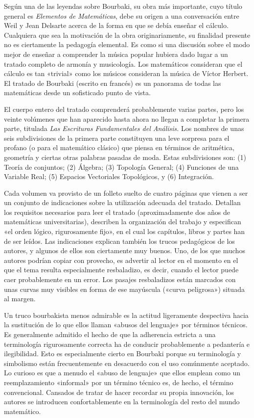 \documentclass[a4paper, 12pt]{article}
\begin{document}
Según una de las leyendas sobre Bourbaki, su obra más 
importante, cuyo título general es {\it Elementos de Matemáticas}, debe 
su origen a una conversación entre Weil y Jean Delsarte acerca de la 
forma en que se debía enseñar el cálculo. Cualquiera que sea la 
motivación de la obra originariamente, su finalidad presente no es 
ciertamente la pedagogía elemental. Es como si una discusión sobre 
el modo mejor de enseñar a comprender la música popular hubiera dado 
lugar a un tratado completo de armonía y musicología. Los 
matemáticos consideran que el cálculo es tan «trivial» como los 
músicos consideran la música de Víctor Herbert. El tratado de 
Bourbaki (escrito en francés) es un panorama de todas las 
matemáticas desde un sofisticado punto de vista. 

El cuerpo entero del tratado comprenderá probablemente varias 
partes, pero los veinte volúmenes que han aparecido hasta ahora no 
llegan a completar la primera parte, titulada {\it Las Escrituras Fundamentales 
del Análisis.} Los nombres de unas seis subdivisiones de la primera parte 
constituyen una leve sorpresa para el profano (o para el matemático 
clásico) que piensa en términos de aritmética, geometría y 
ciertas otras palabras pasadas de moda. Estas subdivisiones son: (1) 
Teoría de conjuntos; (2) Álgebra; (3) Topología General; (4) 
Funciones de una Variable Real; (5) Espacios Vectoriales Topológicos, y 
(6) Integración. 

Cada volumen va provisto de un folleto suelto de cuatro páginas que 
vienen a ser un conjunto de indicaciones sobre la utilización adecuada 
del tratado. Detallan los requisitos necesarios para leer el tratado 
(aproximadamente dos años de matemáticas universitarias), describen 
la organización del trabajo y especifican «el orden lógico, 
rigurosamente fijo», en el cual los capítulos, libros y partes han de 
ser leídos. Las indicaciones explican también los trucos 
pedagógicos de los autores, y algunos de ellos son ciertamente muy 
buenos. Uno, de los que muchos autores podrían copiar con provecho, es 
advertir al lector en el momento en el que el tema resulta especialmente 
resbaladizo, es decir, cuando el lector puede caer probablemente en un 
error. Los pasajes resbaladizos están marcados con unas curvas muy 
visibles en forma de ese mayúscula («curva peligrosa») situada al 
margen. 

Un truco bourbakista menos admirable es la actitud ligeramente 
despectiva hacia la sustitución de lo que ellos llaman «abusos del 
lenguaje» por términos técnicos. Es generalmente admitido el hecho 
de que la adherencia estricta a una terminología rigurosamente correcta 
ha de conducir probablemente a pedantería e ilegibilidad. Esto es 
especialmente cierto en Bourbaki porque su terminología y simbolismo 
están frecuentemente en desacuerdo con el uso comúnmente aceptado. 
Lo curioso es que a menudo el «abuso de lenguaje» que ellos emplean como 
un reemplazamiento «informal» por un término técnico es, de hecho, 
el término convencional. Cansados de tratar de hacer recordar su propia 
innovación, los autores se introducen confortablemente en la 
terminología del resto del mundo matemático. 
\end{document}
